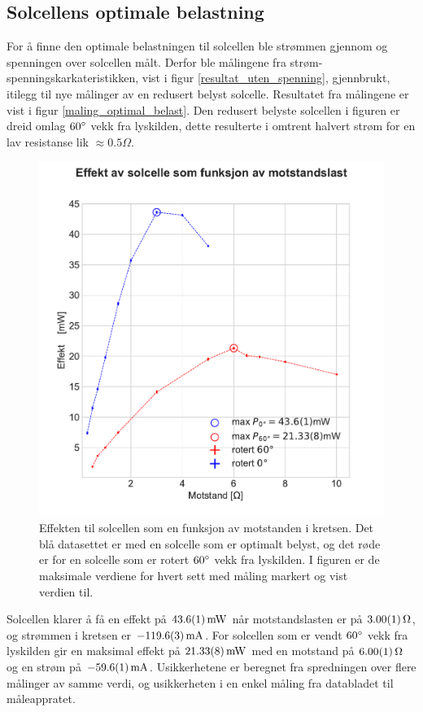 \documentclass[%
 reprint,
 amsmath,amssymb,
 aps,
 norsk,
 booktabs
]{revtex4-1}
\begin{document}
\subsection{Solcellens optimale belastning}
For å finne den optimale belastningen til solcellen ble strømmen gjennom og spenningen over solcellen målt. Derfor ble målingene fra strøm-spenningskarkateristikken, vist i figur \vref{resultat_uten_spenning}, gjennbrukt, itilegg til nye målinger av en redusert belyst solcelle. Resultatet fra målingene er vist i figur \vref{maling_optimal_belast}. Den redusert belyste solcellen i figuren er dreid omlag $60\degree$ vekk fra lyskilden, dette resulterte i omtrent halvert strøm for en lav resistanse lik $\approx 0.5\Omega$.
\begin{figure}
  \centering
  \includegraphics[scale=0.47]{effekt.pdf}
  \caption{Effekten til solcellen som en funksjon av motstanden i kretsen. Det blå datasettet er med en solcelle som er optimalt belyst, og det røde er for en solcelle som er rotert $60\degree$ vekk fra lyskilden. I figuren er de maksimale verdiene for hvert sett med måling markert og vist verdien til.}
  \label{maling_optimal_belast}
\end{figure}
Solcellen klarer å få en effekt på $\SI{43.6\pm0.1}{\milli\watt}$ når motstandslasten er på $\SI{3.00\pm0.01}{\Omega}$, og strømmen i kretsen er $-\SI{119.6\pm0.3}{\milli\ampere}$. For solcellen som er vendt $60\degree$ vekk fra lyskilden gir en maksimal effekt på $\SI{21.33\pm0.08}{\milli\watt}$ med en motstand på $\SI{6.00\pm0.01}{\Omega}$ og en strøm på $-\SI{59.6\pm0.1}{\milli\ampere}$. Usikkerhetene er beregnet fra spredningen over flere målinger av samme verdi, og usikkerheten i en enkel måling fra databladet til måleappratet.
\end{document}
